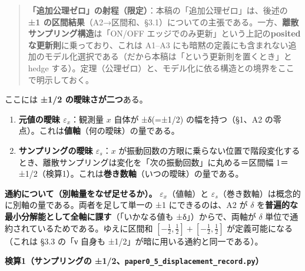 \documentclass[
]{ltjsarticle}
\providecommand{\tightlist}{%
  \setlength{\itemsep}{0pt}\setlength{\parskip}{0pt}}
\begin{document}
\begin{quote}
\textbf{「追加公理ゼロ」の射程（限定）}：本稿の「追加公理ゼロ」は、後述の
\textbf{±1
の区間結果}（A2→区間和、§3.1）についての主張である。一方、\textbf{離散サンプリング構造}は「ON/OFF
エッジでのみ更新」という上記の\textbf{posited
な更新則}に乗っており、これは A1--A3
にも暗黙の定義にも含まれない追加のモデル化選択である（だから本稿は「という更新則を置くとき」と
hedge
する）。定理（公理ゼロ）と、モデル化に依る構造との境界をここで明示しておく。
\end{quote}

ここには \textbf{±1/2 の曖昧さが二つ}ある。

\begin{enumerate}
\def\labelenumi{\arabic{enumi}.}
\tightlist
\item
  \textbf{元値の曖昧 \(\varepsilon_x\)}：観測量 \(x\) 自体が ±δ(=±1/2)
  の幅を持つ（§1、A2
  の零点）。これは\textbf{値軸}（何の曖昧）の量である。
\item
  \textbf{サンプリングの曖昧 \(\varepsilon_s\)}：\(x\)
  が振動回数の方眼に乗らない位置で階段変化するとき、離散サンプリングは変化を「次の振動回数」に丸める＝区間幅
  1＝±1/2（検算1）。これは\textbf{巻き数軸}（いつの曖昧）の量である。
\end{enumerate}

\textbf{通約について（別軸量をなぜ足せるか）。}
\(\varepsilon_x\)（値軸）と
\(\varepsilon_s\)（巻き数軸）は概念的に別軸の量である。両者を足して単一の
±1 にできるのは、A2 が \(\delta\)
を\textbf{普遍的な最小分解能として全軸に課す}（「いかなる値も
±δ」）からで、両軸が \(\delta\)
単位で通約されているためである。ゆえに区間和
\([-\tfrac12,\tfrac12]+[-\tfrac12,\tfrac12]\) が定義可能になる（これは
§3.3 の「ν 自身も ±1/2」が暗に用いる通約と同一である）。

\textbf{検算1（サンプリングの
±1/2、\texttt{paper0\_5\_displacement\_record.py}）}
\end{document}
